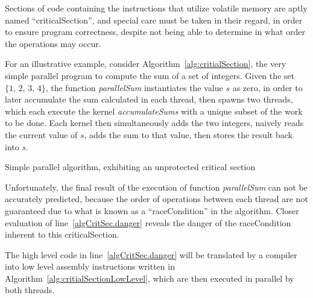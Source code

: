 Sections of code containing the instructions that utilize volatile memory are aptly named ``\gls{criticalSection}'', and special care must be taken in their regard, in order to ensure program correctness, despite not being able to determine in what order the operations may occur.

For an illustrative example, consider Algorithm~\ref{alg:critialSection}, the very simple parallel program to compute the sum of a set of integers. Given the set $\{1,\,2,\,3,\,4\}$, the function \textit{parallelSum} instantiates the value $s$ as zero, in order to later accumulate the sum calculated in each thread, then spawns two threads, which each execute the kernel \textit{accumulateSums} with a unique subset of the work to be done. Each kernel then simultaneously adds the two integers, naively reads the current value of $s$, adds the sum to that value, then stores the result back into $s$.

\begin{algorithm}[ht]
	\DontPrintSemicolon


	\bigskip
\nl	{}

	\bigskip
\nl	{}
	\caption{Simple parallel algorithm, exhibiting an unprotected critical section \label{alg:critialSection}}
\end{algorithm}%

Unfortunately, the final result of the execution of function \textit{parallelSum} can not be accurately predicted, because the order of operations between each thread are not guaranteed due to what is known as a ``\gls{raceCondition}'' in the algorithm. Closer evaluation of line~\ref{algCritSec.danger} reveals the danger of the \gls{raceCondition} inherent to this \gls{criticalSection}.

The high level code in line~\ref{algCritSec.danger} will be translated by a compiler into low level assembly instructions written in Algorithm~\ref{alg:critialSectionLowLevel}, which are then executed in parallel by both threads.

